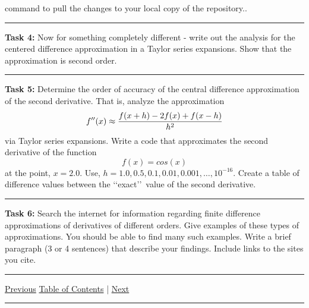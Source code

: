 \documentclass[10pt,fleqn]{article}
\begin{document}
\begin{trivlist}
\begin{verbatim}
        \end{verbatim}
        command to pull the changes to your local copy of the repository..
\vskip0.1in\hrule\vskip0.1in \noindent
  \item[\bf Task 4:] Now for something completely different - write out the
        analysis for the centered difference approximation in a Taylor series
        expansions. Show that the approximation is second order.
\vskip0.1in\hrule\vskip0.1in \noindent
  \item[\bf Task 5:] Determine the order of accuracy of the central difference
        approximation of the second derivative. That is, analyze the
        approximation
        \[
          f''(x) \approx {{f(x+h) - 2 f(x) + f(x-h)}\over{h^2}}
        \]
        via Taylor series expansions. Write a code that approximates the second
        derivative of the function
        \[
          f(x) = cos(x)
        \] 
        at the point, \(x=2.0\). Use,
        \(h=1.0,0.5,0.1,0.01,0.001,\ldots,10^{-16}\). Create a table of
        difference values between the \lq\lq exact\rq\rq\ value of the second
        derivative.
\vskip0.1in\hrule\vskip0.1in \noindent
  \item[\bf Task 6:] Search the internet for information regarding finite
        difference approximations of derivatives of different orders. Give
        examples of these types of approximations. You should be able to find
        many such examples. Write a brief paragraph (3 or 4 sentences) that
        describe your findings. Include links to the sites you cite.
\end{trivlist}
\vskip0.1in\hrule\vskip0.1in \noindent
  \href{../../tasksheet_01/html/tasksheet_01.html}{Previous}
  \href{../../toc/md/tasksheet_toc.md}{Table of Contents} |
  \href{../../tasksheet_03/html/tasksheet_03.html}{Next}
\vskip0.1in\hrule\vskip0.1in \noindent
\end{document}
